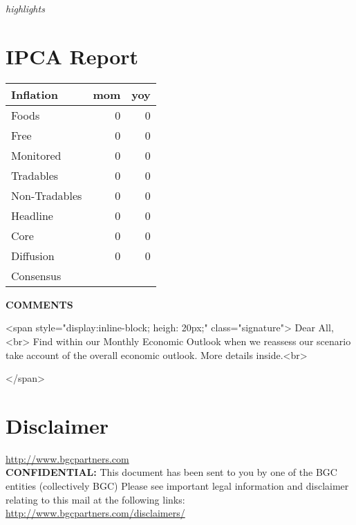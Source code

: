 \documentclass{report}
\date{}
\title{}
\begin{document}
\begin{export}
\thispagestyle{firstpagestyle}
\JournalIssue
\begin{tcolorbox}[colbak=red!5!white, colframe=red!0!white]
 \it{{highlights}}
\end{tcolorbox}
\vspace{-0.5cm}
\end{export}

\section{IPCA Report}
\label{sec-1}

\begin{center}
\begin{tabular}{lrr}
\hline
Inflation & mom & yoy\\
\hline
Foods & 0 & 0\\
Free & 0 & 0\\
Monitored & 0 & 0\\
Tradables & 0 & 0\\
Non-Tradables & 0 & 0\\
\hline
Headline & 0 & 0\\
Core & 0 & 0\\
Diffusion & 0 & 0\\
\hline
Consensus &  & \\
\hline
\end{tabular}
\end{center}
\textbf{COMMENTS}




<span style="display:inline-block; heigh: 20px;" class="signature">
Dear All, <br>
Find within our Monthly Economic Outlook when we reassess our scenario
take account of the overall economic outlook. More details inside.<br>

</span>




\begin{export}
\newpage
\end{export}

\section{Disclaimer}
\label{sec-2}
\url{http://www.bgcpartners.com} \\
\textbf{CONFIDENTIAL:} This document has been sent to you by one of
the BGC entities (collectively BGC) Please see important legal
information and disclaimer relating to this mail at the following
links: \url{http://www.bgcpartners.com/disclaimers/}
\end{document}
